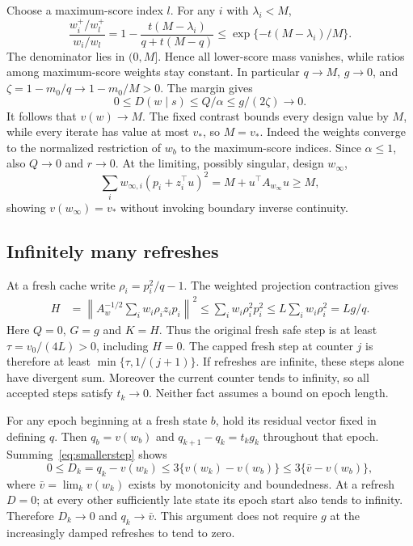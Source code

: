 \documentclass[11pt]{article}
\begin{document}
Choose a maximum-score index $l$. For any $i$ with $\lambda_i<M$,
\[
 \frac{w_i^+/w_l^+}{w_i/w_l}
 =1-\frac{t(M-\lambda_i)}{q+t(M-q)}
 \le\exp\{-t(M-\lambda_i)/M\}.
\]
The denominator lies in $(0,M]$. Hence all lower-score mass vanishes, while ratios among maximum-score weights stay constant. In particular $q\to M$, $g\to0$, and
$\zeta=1-m_0/q\to1-m_0/M>0$.
The margin gives
\[
 0\le D(w\mid s)\le Q/\alpha\le g/(2\zeta)\to0.
\]
It follows that $v(w)\to M$. The fixed contrast bounds every design value by $M$, while every iterate has value at most $v_*$, so $M=v_*$. Indeed the weights converge to the normalized restriction of $w_b$ to the maximum-score indices. Since $\alpha\le1$, also $Q\to0$ and $r\to0$. At the limiting, possibly singular, design $w_\infty$,
\[
 \sum_i w_{\infty,i}(p_i+z_i^\top u)^2
 =M+u^\top A_{w_\infty}u\ge M,
\]
showing $v(w_\infty)=v_*$ without invoking boundary inverse continuity.

\subsection{Infinitely many refreshes}
At a fresh cache write $\rho_i=p_i^2/q-1$. The weighted projection contraction gives
\begin{align*}
 H&=\left\|A_w^{-1/2}\sum_iw_i\rho_i z_i p_i\right\|^2
 \le\sum_iw_i\rho_i^2p_i^2
 \le L\sum_iw_i\rho_i^2=L g/q.
\end{align*}
Here $Q=0$, $G=g$ and $K=H$. Thus the original fresh safe step is at least $\tau=v_0/(4L)>0$, including $H=0$. The capped fresh step at counter $j$ is therefore at least $\min\{\tau,1/(j+1)\}$. If refreshes are infinite, these steps alone have divergent sum. Moreover the current counter tends to infinity, so all accepted steps satisfy $t_k\to0$. Neither fact assumes a bound on epoch length.

For any epoch beginning at a fresh state $b$, hold its residual vector fixed in defining $q$. Then $q_b=v(w_b)$ and
$q_{k+1}-q_k=t_kg_k$ throughout that epoch. Summing~\eqref{eq:smallerstep} shows
\begin{equation}\label{eq:epoch-supp}
 0\le D_k=q_k-v(w_k)
 \le3\{v(w_k)-v(w_b)\}\le3\{\bar v-v(w_b)\},
\end{equation}
where $\bar v=\lim_k v(w_k)$ exists by monotonicity and boundedness. At a refresh $D=0$; at every other sufficiently late state its epoch start also tends to infinity. Therefore $D_k\to0$ and $q_k\to\bar v$. This argument does not require $g$ at the increasingly damped refreshes to tend to zero.
\end{document}

